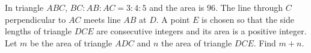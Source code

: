 In triangle $ABC$, $BC:AB:AC=3:4:5$ and the area is $96$. The line through $C$ perpendicular to $AC$ meets line $AB$ at $D$. A point $E$ is chosen so that the side lengths of triangle $DCE$ are consecutive integers and its area is a positive integer. Let $m$ be the area of triangle $ADC$ and $n$ the area of triangle $DCE$. Find $m+n$.
